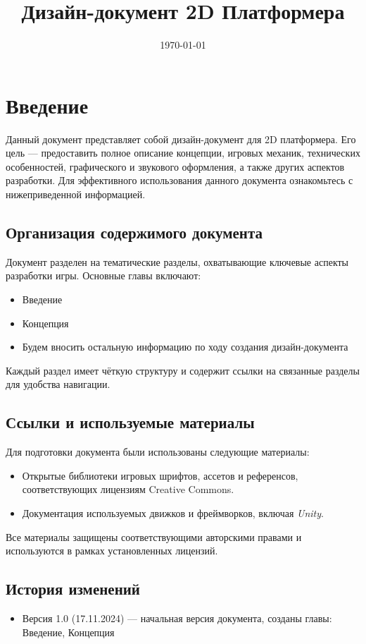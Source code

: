 \documentclass[a4paper,12pt]{article}
\title{Дизайн-документ 2D Платформера}
\date{\today}
\begin{document}
\maketitle

\section{Введение}
Данный документ представляет собой дизайн-документ для 2D платформера. Его цель — предоставить полное описание концепции, игровых механик, технических особенностей, графического и звукового оформления, а также других аспектов разработки. Для эффективного использования данного документа ознакомьтесь с нижеприведенной информацией.

\subsection{Организация содержимого документа}
Документ разделен на тематические разделы, охватывающие ключевые аспекты разработки игры. Основные главы включают:
\begin{itemize}
    \item Введение
    \item Концепция
    \item Будем вносить остальную информацию по ходу создания дизайн-документа
\end{itemize}
Каждый раздел имеет чёткую структуру и содержит ссылки на связанные разделы для удобства навигации.

\subsection{Ссылки и используемые материалы}
Для подготовки документа были использованы следующие материалы:
\begin{itemize}
    \item Открытые библиотеки игровых шрифтов, ассетов и референсов, соответствующих лицензиям Creative Commons.
    \item Документация используемых движков и фреймворков, включая \textit{Unity}.
\end{itemize}
Все материалы защищены соответствующими авторскими правами и используются в рамках установленных лицензий.
\subsection{История изменений}
\begin{itemize}
    \item Версия 1.0 (17.11.2024) — начальная версия документа, созданы главы: Введение, Концепция
\end{itemize}
\end{document}
